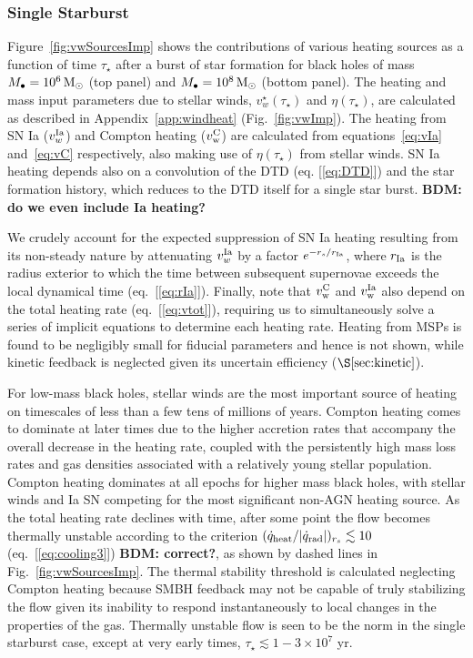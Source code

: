\documentclass[usenatbib,fleqn]{mn2e}
\newcommand{\rs}{r_s}
\newcommand{\Mbh}[1][]{M_{\bullet#1}}
\newcommand{\rIa}{r_{\rm Ia}}
\begin{document}
\subsubsection{Single Starburst}

Figure~\ref{fig:vwSourcesImp} shows the contributions of various heating sources as a function of time $\tau_{\star}$ after a burst of star formation for black holes of mass $\Mbh = 10^{6} \Msun$ (top panel) and $\Mbh = 10^{8} \Msun$ (bottom panel). The heating and mass input parameters due to stellar winds, $v_{w}^{\star}(\tau_{\star})$ and $\eta(\tau_{\star})$, are calculated as described in Appendix~\ref{app:windheat} (Fig.~\ref{fig:vwImp}).  The heating from SN Ia ($v_{w}^{\rm Ia}$) and Compton heating ($v_{\rm w}^{\rm C}$) are calculated from equations~\eqref{eq:vIa} and~\eqref{eq:vC} respectively, also making use of $\eta(\tau_{\star})$ from stellar winds.  SN Ia heating depends also on a convolution of the DTD (eq. [\ref{eq:DTD}]) and the star formation history, which reduces to the DTD itself for a single star burst.  {\bf BDM: do we even include Ia heating?} 

We crudely account for the expected suppression of SN Ia heating resulting from its non-steady nature by attenuating $v_{w}^{\rm Ia}$ by a factor $e^{-\rs/\rIa}$, where $r_{\rm Ia}$ is the radius exterior to which the time between subsequent supernovae exceeds the local dynamical time (eq.~[\ref{eq:rIa}]).  Finally, note that $v_{\rm w}^{\rm C}$ and $v_{\rm w}^{\rm Ia}$ also depend on the total heating rate (eq.~[\ref{eq:vtot}]), requiring us to simultaneously solve a series of implicit equations to determine each heating rate.  Heating from MSPs is found to be negligibly small for fiducial parameters and hence is not shown, while kinetic feedback is neglected given its uncertain efficiency ($\S\ref{sec:kinetic}$).  

For low-mass black holes, stellar winds are the most important source of heating on
timescales of less than a few tens of millions of years.  Compton
heating comes to dominate at later times due to the higher accretion
rates that accompany the overall decrease in the heating rate, coupled
with the persistently high mass loss rates and gas densities associated with a relatively young
stellar population.  Compton heating dominates at all epochs for
higher mass black holes, with stellar winds and Ia SN competing for
the most significant non-AGN heating source.  As the total heating
rate declines with time, after some point the flow becomes thermally
unstable according to the criterion $(\dot{q}_{\rm heat}/|\dot{q}_{\rm
  rad}|)_{r_{s}} \lesssim 10$ (eq.~[\ref{eq:cooling3}]) {\bf BDM: correct?}, as shown by
dashed lines in Fig.~\ref{fig:vwSourcesImp}.  The thermal stability threshold is
calculated neglecting Compton heating because SMBH feedback may not be
capable of truly stabilizing the flow given its inability to respond
instantaneously to local changes in the properties of the gas.
Thermally unstable flow is seen to be the norm in the single starburst
case, except at very early times, $\tau_{\star} \lesssim 1-3 \times
10^7$ yr.
\end{document}
